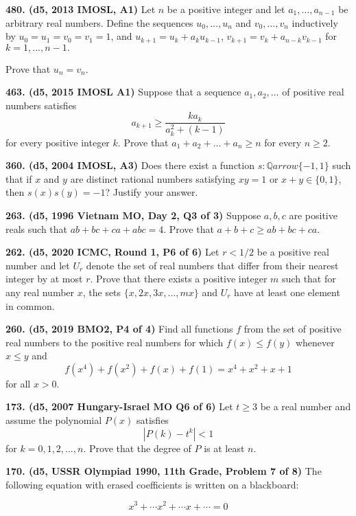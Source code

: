 \documentclass{article}
\begin{document}
\textbf{480. (\color{red}d5\color{black}, 2013 IMOSL, A1)} Let $n$ be a positive integer and let $a_1, \ldots, a_{n-1} $ be arbitrary real numbers. Define the sequences $u_0, \ldots, u_n $ and $v_0, \ldots, v_n $ inductively by $u_0 = u_1  = v_0 = v_1 = 1$, and $u_{k+1} = u_k + a_k u_{k-1}$, $v_{k+1} = v_k + a_{n-k} v_{k-1}$ for $k=1, \ldots, n-1.$

Prove that $u_n = v_n.$

\textbf{463. (\color{red}d5\color{black}, 2015 IMOSL A1)} Suppose that a sequence $a_1,a_2,\ldots$ of positive real numbers satisfies \[a_{k+1}\geq\frac{ka_k}{a_k^2+(k-1)}\]for every positive integer $k$. Prove that $a_1+a_2+\ldots+a_n\geq n$ for every $n\geq2$.

\textbf{360. (\color{red}d5\color{black}, 2004 IMOSL, A3)} Does there exist a function $s\colon \mathbb{Q} arrow \{-1,1\}$ such that if $x$ and $y$ are distinct rational numbers satisfying ${xy=1}$ or ${x+y\in \{0,1\}}$, then ${s(x)s(y)=-1}$? Justify your answer.

\textbf{263. (\color{red}d5\color{black}, 1996 Vietnam MO, Day 2, Q3 of 3)} Suppose $a,b,c$ are positive reals such that $ab+bc+ca+abc=4$. Prove that $a+b+c \geq ab+bc+ca$.

\textbf{262. (\color{red}d5\color{black}, 2020 ICMC, Round 1, P6 of 6)} Let $ r < 1/2 $ be a positive real number and let $ U_r $ denote the set of real numbers that differ from their nearest integer by at most $ r $. Prove that there exists a positive integer $ m $ such that for any real number $ x $, the sets $ \{x, 2x, 3x, \dots, mx\} $ and $ U_r$ have at least one element in common.

\textbf{260. (\color{red}d5\color{black}, 2019 BMO2, P4 of 4)} Find all functions $f$ from the set of positive real numbers to the positive real numbers for which $f(x) \leq f(y)$ whenever $x \leq y$ and \[f(x^4)+f(x^2)+f(x)+f(1) = x^4+x^2+x+1\] for all $x > 0$.

\textbf{173. (\color{red}d5\color{black}, 2007 Hungary-Israel MO Q6 of 6)} Let $t \geq 3$ be a real number and assume the polynomial $P(x)$ satisfies $$ | P(k) - t^k  | < 1$$ for $k = 0, 1, 2, \dots, n.$ Prove that the degree of $P$ is at least $n.$

\textbf{170. (\color{red}d5\color{black}, USSR Olympiad 1990, 11th Grade, Problem 7 of 8)} The following equation with erased coefficients is written on a blackboard:

\[x^3 + \cdots x^2 + \cdots x + \cdots = 0\]
\end{document}
